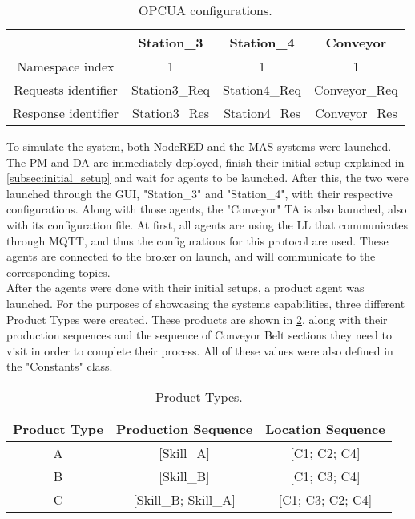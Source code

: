 \begin{table}[h!]
	\centering
	\caption{\acrshort{OPCUA} configurations.}
	\begin{tabular}{c|c|c|c|}
		\cline{2-4}
		& Station\_3    & Station\_4    & Conveyor      \\ \hline
		\multicolumn{1}{|c|}{Namespace index}     & 1             & 1             & 1             \\ \hline
		\multicolumn{1}{|c|}{Requests identifier} & Station3\_Req & Station4\_Req & Conveyor\_Req \\ \hline
		\multicolumn{1}{|c|}{Response identifier} & Station3\_Res & Station4\_Res & Conveyor\_Res \\ \hline
	\end{tabular}
	\label{tab:opcua_config}
\end{table}

To simulate the system, both NodeRED and the \acrshort{MAS} systems were launched. The \acrlong{PM} and \acrlong{DA} are immediately deployed, finish their initial setup explained in \ref{subsec:initial_setup} and wait for agents to be launched. After this, the two  were launched through the \acrshort{GUI}, "Station\_3" and "Station\_4", with their respective configurations. Along with those agents, the "Conveyor" \acrlong{TA} is also launched, also with its configuration file. At first, all agents are using the \acrshort{LL} that communicates through \acrshort{MQTT}, and thus the configurations for this protocol are used. These agents are connected to the broker on launch, and will communicate to the corresponding topics.\\

After the agents were done with their initial setups, a product agent was launched. For the purposes of showcasing the systems capabilities, three different Product Types were created. These products are shown in \ref{tab:product_types}, along with their production sequences and the sequence of Conveyor Belt sections they need to visit in order to complete their process. All of these values were also defined in the "Constants" class.

\begin{table}[h!]
	\caption{Product Types.}
	\centering
	\begin{tabular}{|c|c|c|}
		\hline
		Product Type & Production Sequence      & Location Sequence    \\ \hline
		A            & {[}Skill\_A{]}           & {[}C1; C2; C4{]}     \\ \hline
		B            & {[}Skill\_B{]}           & {[}C1; C3; C4{]}     \\ \hline
		C            & {[}Skill\_B; Skill\_A{]} & {[}C1; C3; C2; C4{]} \\ \hline
	\end{tabular}
	\label{tab:product_types}
\end{table}

